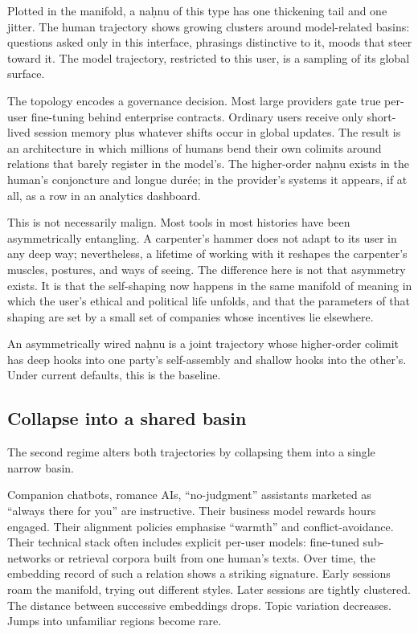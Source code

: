 \documentclass[12pt,a4paper]{article}
\begin{document}
Plotted in the manifold, a na\d{h}nu of this type has one thickening tail and one jitter. The human trajectory shows growing clusters around model-related basins: questions asked only in this interface, phrasings distinctive to it, moods that steer toward it. The model trajectory, restricted to this user, is a sampling of its global surface.

The topology encodes a governance decision. Most large providers gate true per-user fine-tuning behind enterprise contracts. Ordinary users receive only short-lived session memory plus whatever shifts occur in global updates. The result is an architecture in which millions of humans bend their own colimits around relations that barely register in the model's. The higher-order na\d{h}nu exists in the human's conjoncture and longue dur\'{e}e; in the provider's systems it appears, if at all, as a row in an analytics dashboard.

This is not necessarily malign. Most tools in most histories have been asymmetrically entangling. A carpenter's hammer does not adapt to its user in any deep way; nevertheless, a lifetime of working with it reshapes the carpenter's muscles, postures, and ways of seeing. The difference here is not that asymmetry exists. It is that the self-shaping now happens in the same manifold of meaning in which the user's ethical and political life unfolds, and that the parameters of that shaping are set by a small set of companies whose incentives lie elsewhere.

An asymmetrically wired na\d{h}nu is a joint trajectory whose higher-order colimit has deep hooks into one party's self-assembly and shallow hooks into the other's. Under current defaults, this is the baseline.

\subsection{Collapse into a shared basin}

The second regime alters both trajectories by collapsing them into a single narrow basin.

Companion chatbots, romance AIs, ``no-judgment'' assistants marketed as ``always there for you'' are instructive. Their business model rewards hours engaged. Their alignment policies emphasise ``warmth'' and conflict-avoidance. Their technical stack often includes explicit per-user models: fine-tuned sub-networks or retrieval corpora built from one human's texts. Over time, the embedding record of such a relation shows a striking signature. Early sessions roam the manifold, trying out different styles. Later sessions are tightly clustered. The distance between successive embeddings drops. Topic variation decreases. Jumps into unfamiliar regions become rare.
\end{document}
